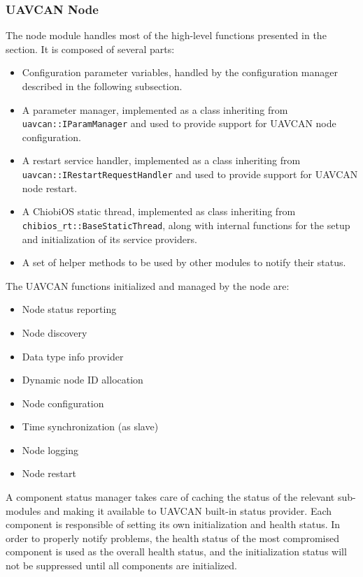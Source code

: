 \subsubsection{UAVCAN Node}
The node module handles most of the high-level functions presented in the  section.
It is composed of several parts:
\begin{itemize}
    \item Configuration parameter variables, handled by the configuration manager described in the following subsection.
    \item A parameter manager, implemented as a class inheriting from \texttt{uavcan::IParamManager} and used to provide support for UAVCAN node configuration.
    \item A restart service handler, implemented as a class inheriting from \texttt{uavcan::IRestartRequestHandler} and used to provide support for UAVCAN node restart.
    \item A ChiobiOS static thread, implemented as class inheriting from \texttt{chibios\_rt::BaseStaticThread}, along with internal functions for the setup and initialization of its service providers.
    \item A set of helper methods to be used by other modules to notify their status.
\end{itemize}

The UAVCAN functions initialized and managed by the node are:
\begin{itemize}
    \item Node status reporting
    \item Node discovery
    \item Data type info provider
    \item Dynamic node ID allocation
    \item Node configuration
    \item Time synchronization (as slave)
    \item Node logging
    \item Node restart
\end{itemize}

A component status manager takes care of caching the status of the relevant sub-modules and making it available to UAVCAN built-in status provider.
Each component is responsible of setting its own initialization and health status.
In order to properly notify problems, the health status of the most compromised component is used as the overall health status, and the initialization status will not be suppressed until all components are initialized.

